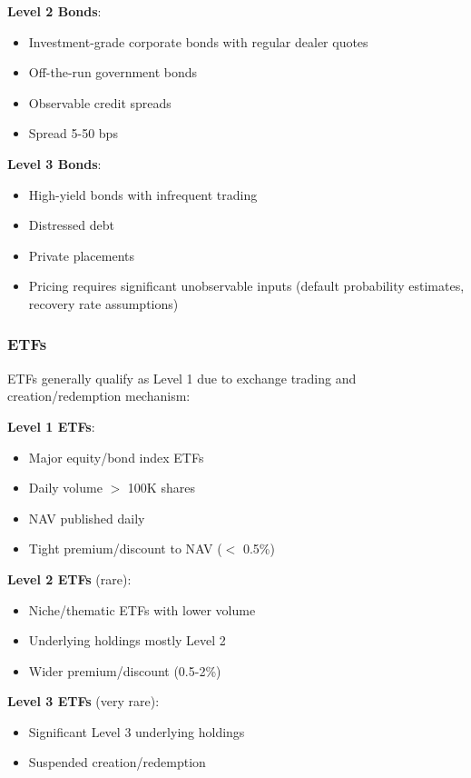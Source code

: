 \documentclass[11pt,a4paper]{article}
\begin{document}
\textbf{Level 2 Bonds}:
\begin{itemize}
    \item Investment-grade corporate bonds with regular dealer quotes
    \item Off-the-run government bonds
    \item Observable credit spreads
    \item Spread 5-50 bps
\end{itemize}

\textbf{Level 3 Bonds}:
\begin{itemize}
    \item High-yield bonds with infrequent trading
    \item Distressed debt
    \item Private placements
    \item Pricing requires significant unobservable inputs (default probability estimates, recovery rate assumptions)
\end{itemize}

\subsubsection{ETFs}

ETFs generally qualify as Level 1 due to exchange trading and creation/redemption mechanism:

\textbf{Level 1 ETFs}:
\begin{itemize}
    \item Major equity/bond index ETFs
    \item Daily volume $>$ 100K shares
    \item NAV published daily
    \item Tight premium/discount to NAV ($<$ 0.5\%)
\end{itemize}

\textbf{Level 2 ETFs} (rare):
\begin{itemize}
    \item Niche/thematic ETFs with lower volume
    \item Underlying holdings mostly Level 2
    \item Wider premium/discount (0.5-2\%)
\end{itemize}

\textbf{Level 3 ETFs} (very rare):
\begin{itemize}
    \item Significant Level 3 underlying holdings
    \item Suspended creation/redemption
\end{itemize}
\end{document}
